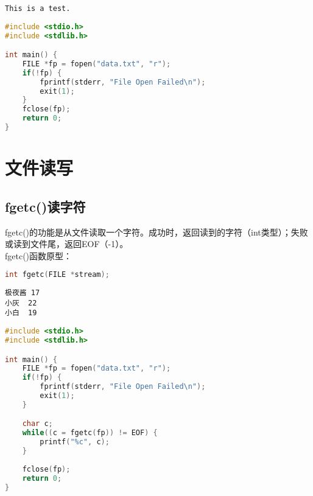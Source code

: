 
\begin{lstlisting}[title=data.txt]
This is a test.
\end{lstlisting}

\begin{lstlisting}[language=C, title=file\_open.c]
#include <stdio.h>
#include <stdlib.h>

int main() {
    FILE *fp = fopen("data.txt", "r");
    if(!fp) {
        fprintf(stderr, "File Open Failed\n");
        exit(1);
    }
    fclose(fp);
    return 0;
}
\end{lstlisting}

\newpage

\section{文件读写}

\subsection{fgetc()读字符}

fgetc()的功能是从文件读取一个字符。成功时，返回读到的字符（int类型）；失败或读到文件尾，返回EOF（-1）。\\

fgetc()函数原型：

\vspace{-0.5cm}

\begin{lstlisting}[language=C]
int fgetc(FILE *stream);
\end{lstlisting}

\vspace{0.5cm}


\begin{lstlisting}[title=data.txt]
极夜酱	17
小灰	22
小白	19
\end{lstlisting}

\begin{lstlisting}[language=C, title=fgetc.c]
#include <stdio.h>
#include <stdlib.h>

int main() {
    FILE *fp = fopen("data.txt", "r");
    if(!fp) {
        fprintf(stderr, "File Open Failed\n");
        exit(1);
    }

    char c;
    while((c = fgetc(fp)) != EOF) {
        printf("%c", c);
    }
    
    fclose(fp);
    return 0;
}
\end{lstlisting}

